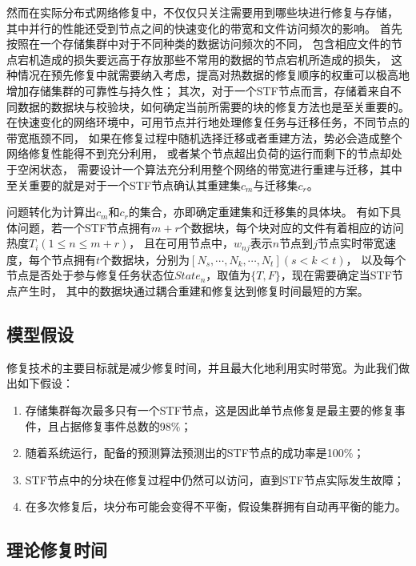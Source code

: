 然而在实际分布式网络修复中，不仅仅只关注需要用到哪些块进行修复与存储，
其中并行的性能还受到节点之间的快速变化的带宽和文件访问频次的影响。
首先按照在一个存储集群中对于不同种类的数据访问频次的不同，
包含相应文件的节点宕机造成的损失要远高于存放那些不常用的数据的节点宕机所造成的损失，
这种情况在预先修复中就需要纳入考虑，提高对热数据的修复顺序的权重可以极高地增加存储集群的可靠性与持久性；
其次，对于一个STF节点而言，存储着来自不同数据的数据块与校验块，如何确定当前所需要的块的修复方法也是至关重要的。
在快速变化的网络环境中，可用节点并行地处理修复任务与迁移任务，不同节点的带宽瓶颈不同，
如果在修复过程中随机选择迁移或者重建方法，势必会造成整个网络修复性能得不到充分利用，
或者某个节点超出负荷的运行而剩下的节点却处于空闲状态，
需要设计一个算法充分利用整个网络的带宽进行重建与迁移，其中至关重要的就是对于一个STF节点确认其重建集$c_m$与迁移集$c_r$。

问题转化为计算出$c_m$和$c_r$的集合，亦即确定重建集和迁移集的具体块。
有如下具体问题，若一个STF节点拥有$m+r$个数据块，每个块对应的文件有着相应的访问热度$T_i(1\leqslant n \leqslant m+r)$，
且在可用节点中，$w_{nj}$表示$n$节点到$j$节点实时带宽速度，每个节点拥有$t$个数据块，分别为$[N_s,\cdots,N_k,\cdots,N_t](s<k<t)$，
以及每个节点是否处于参与修复任务状态位$State_n$，取值为$\{T,F\}$，现在需要确定当STF节点产生时，
其中的数据块通过耦合重建和修复达到修复时间最短的方案。

\subsection{模型假设}
修复技术的主要目标就是减少修复时间，并且最大化地利用实时带宽。为此我们做出如下假设：

\begin{enumerate}
	\item 存储集群每次最多只有一个STF节点，这是因此单节点修复是最主要的修复事件，且占据修复事件总数的98\%\cite{rashmi2013solution}；
	\item 随着系统运行，配备的预测算法预测出的STF节点的成功率是100\%；
	\item STF节点中的分块在修复过程中仍然可以访问，直到STF节点实际发生故障；
	\item 在多次修复后，块分布可能会变得不平衡，假设集群拥有自动再平衡的能力。
\end{enumerate}

\subsection{理论修复时间}
\label{subsection3.1}

